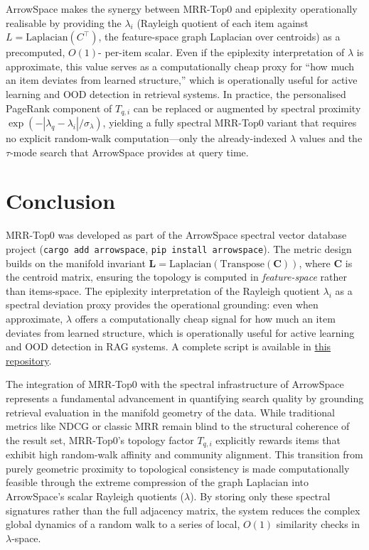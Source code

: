 \documentclass[11pt,a4paper]{article}
\begin{document}
ArrowSpace makes the synergy between MRR-Top0 and epiplexity 
operationally realisable by providing the $\lambda_i$ (Rayleigh 
quotient of each item against $L = \mathrm{Laplacian}(C^\top)$, the 
feature-space graph Laplacian over centroids) as a precomputed, $O(1)$-
per-item scalar. Even if the epiplexity interpretation of $\lambda$ is 
approximate, this value serves as a computationally cheap proxy for 
``how much an item deviates from learned structure,'' which is 
operationally useful for active learning and OOD detection in retrieval 
systems. In practice, the personalised PageRank component of 
$T_{q,i}$ can be replaced or augmented by spectral proximity 
$\exp(-|\lambda_q - \lambda_i|/\sigma_\lambda)$, yielding a 
fully spectral MRR-Top0 variant that requires no explicit random-walk 
computation---only the already-indexed $\lambda$ values and the 
$\tau$-mode search that ArrowSpace provides at query time.

\section{Conclusion}

MRR-Top0 was developed as part of the ArrowSpace spectral vector database
project \cite{Moriondo2025ArrowSpace} (\texttt{cargo add arrowspace}, \texttt{pip install arrowspace}).
The metric design builds on the manifold invariant
$\mathbf{L} = \mathrm{Laplacian}(\mathrm{Transpose}(\mathbf{C}))$, where
$\mathbf{C}$ is the centroid matrix, ensuring the topology is computed in
\emph{feature-space} rather than items-space.  The epiplexity
interpretation of the Rayleigh quotient $\lambda_i$ as a spectral deviation
proxy provides the operational grounding: even when approximate, $\lambda$
offers a computationally cheap signal for how much an item deviates from
learned structure, which is operationally useful for active learning and
OOD detection in RAG systems. A complete script is available in \href{https://github.com/tuned-org-uk/pyarrowspace/blob/c3d9a40e00a04fa05660f76eb982793e2e80e773/tests/test_15_CVE_pagerank.py}{this repository}.

The integration of MRR-Top0 with the spectral infrastructure of ArrowSpace represents a fundamental advancement in quantifying search quality by grounding retrieval evaluation in the manifold geometry of the data. While traditional metrics like NDCG or classic MRR remain blind to the structural coherence of the result set, MRR-Top0’s topology factor $T_{q,i}$ explicitly rewards items that exhibit high random-walk affinity and community alignment. This transition from purely geometric proximity to topological consistency is made computationally feasible through the extreme compression of the graph Laplacian into ArrowSpace's scalar Rayleigh quotients ($\lambda$). By storing only these spectral signatures rather than the full adjacency matrix, the system reduces the complex global dynamics of a random walk to a series of local, $O(1)$ similarity checks in $\lambda$-space.
\end{document}
